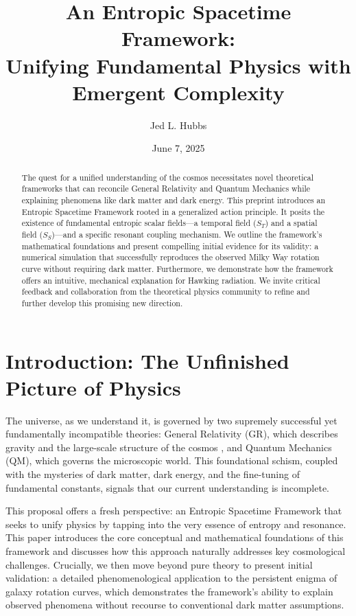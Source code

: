 \documentclass[11pt,a4paper]{article}
\title{\textbf{An Entropic Spacetime Framework: \\ Unifying Fundamental Physics with Emergent Complexity}}
\author[1]{Jed L. Hubbs}
\affil[1]{\textit{Assistant Professor, Boston Children's Hospital/Harvard Medical School}}
\affil[ ]{\url{jed.hubbs@childrens.harvard.edu}}
\date{June 7, 2025}
\newcommand{\ST}{S_T}
\newcommand{\SSp}{S_S}
\begin{document}
\maketitle

\begin{abstract}
\noindent The quest for a unified understanding of the cosmos necessitates novel theoretical frameworks that can reconcile General Relativity and Quantum Mechanics while explaining phenomena like dark matter and dark energy. This preprint introduces an Entropic Spacetime Framework rooted in a generalized action principle. It posits the existence of fundamental entropic scalar fields—a temporal field ($\ST$) and a spatial field ($\SSp$)—and a specific resonant coupling mechanism. We outline the framework's mathematical foundations and present compelling initial evidence for its validity: a numerical simulation that successfully reproduces the observed Milky Way rotation curve without requiring dark matter. Furthermore, we demonstrate how the framework offers an intuitive, mechanical explanation for Hawking radiation. We invite critical feedback and collaboration from the theoretical physics community to refine and further develop this promising new direction.
\end{abstract}

\newpage

\section{Introduction: The Unfinished Picture of Physics}
The universe, as we understand it, is governed by two supremely successful yet fundamentally incompatible theories: General Relativity (GR), which describes gravity and the large-scale structure of the cosmos \cite{Einstein1916}, and Quantum Mechanics (QM), which governs the microscopic world. This foundational schism, coupled with the mysteries of dark matter, dark energy, and the fine-tuning of fundamental constants, signals that our current understanding is incomplete.

This proposal offers a fresh perspective: an Entropic Spacetime Framework that seeks to unify physics by tapping into the very essence of entropy and resonance. This paper introduces the core conceptual and mathematical foundations of this framework and discusses how this approach naturally addresses key cosmological challenges. Crucially, we then move beyond pure theory to present initial validation: a detailed phenomenological application to the persistent enigma of galaxy rotation curves, which demonstrates the framework's ability to explain observed phenomena without recourse to conventional dark matter assumptions.
\end{document}
